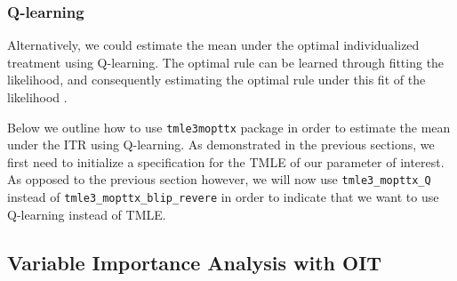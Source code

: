 \documentclass[12pt, krantz2,]{krantz}
\newenvironment{Shaded}{\begin{snugshade}}{\end{snugshade}}
\newcommand{\CommentTok}[1]{\textcolor[rgb]{0.37,0.37,0.37}{\textit{#1}}}
\newcommand{\DataTypeTok}[1]{\textcolor[rgb]{0.27,0.27,0.27}{#1}}
\newcommand{\DecValTok}[1]{\textcolor[rgb]{0.06,0.06,0.06}{#1}}
\newcommand{\KeywordTok}[1]{\textcolor[rgb]{0.27,0.27,0.27}{\textbf{#1}}}
\newcommand{\NormalTok}[1]{#1}
\newcommand{\OperatorTok}[1]{\textcolor[rgb]{0.43,0.43,0.43}{\textbf{#1}}}
\newcommand{\OtherTok}[1]{\textcolor[rgb]{0.37,0.37,0.37}{#1}}
\newcommand{\StringTok}[1]{\textcolor[rgb]{0.5,0.5,0.5}{#1}}
\theoremstyle{definition}
\theoremstyle{definition}
\theoremstyle{definition}
\newcommand{\1}{\mathbbm{1}}
\begin{document}
\hypertarget{q-learning}{%
\subsubsection{Q-learning}\label{q-learning}}

Alternatively, we could estimate the mean under the optimal individualized
treatment using Q-learning. The optimal rule can be learned through fitting the
likelihood, and consequently estimating the optimal rule under this fit of the
likelihood \citep[\citet{murphy2003}]{Sutton1998}.

Below we outline how to use \texttt{tmle3mopttx} package in order to estimate the mean
under the ITR using Q-learning. As demonstrated in the previous sections, we
first need to initialize a specification for the TMLE of our parameter of
interest. As opposed to the previous section however, we will now use
\texttt{tmle3\_mopttx\_Q} instead of \texttt{tmle3\_mopttx\_blip\_revere} in order to indicate that
we want to use Q-learning instead of TMLE.

\begin{Shaded}
\end{Shaded}

\hypertarget{variable-importance-analysis-with-oit}{%
\subsection{Variable Importance Analysis with OIT}\label{variable-importance-analysis-with-oit}}
\end{document}

